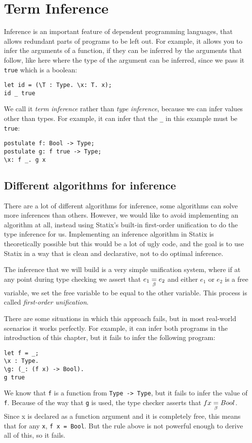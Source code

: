 \chapter{Term Inference}
\label{ch:inference}

Inference is an important feature of dependent programming languages, that allows redundant parts of programs to be left out. For example, it allows you to infer the arguments of a function, if they can be inferred by the arguments that follow, like here where the type of the argument can be inferred, since we pass it \verb|true| which is a boolean:
\begin{lstlisting}
let id = (\T : Type. \x: T. x);
id _ true
\end{lstlisting}

We call it \emph{term inference} rather than \emph{type inference}, because we can infer values other than types. For example, it can infer that the \verb|_| in this example must be \verb|true|:
\begin{lstlisting}
postulate f: Bool -> Type;
postulate g: f true -> Type;
\x: f _. g x
\end{lstlisting}

\section{Different algorithms for inference}
\label{strength-inference}

There are a lot of different algorithms for inference\cite{typeinference}, some algorithms can solve more inferences than others. However, we would like to avoid implementing an algorithm at all, instead using Statix's built-in first-order unification to do the type inference for us. Implementing an inference algorithm in Statix is theoretically possible but this would be a lot of ugly code, and the goal is to use Statix in a way that is clean and declarative, not to do optimal inference.

The inference that we will build is a very simple unification system, where if at any point during type checking we assert that $e_1 \underset{\beta}{=} e_2$ and either $e_1$ or $e_2$ is a free variable, we set the free variable to be equal to the other variable. This process is called \emph{first-order unification}.

There are some situations in which this approach fails, but in most real-world scenarios it works perfectly. For example, it can infer both programs in the introduction of this chapter, but it fails to infer the following program:
\begin{lstlisting}
let f = _;
\x : Type.
\g: (_: (f x) -> Bool).
g true
\end{lstlisting}
We know that \verb|f| is a function from \verb|Type -> Type|, but it fails to infer the value of \verb|f|. Because of the way that \verb|g| is used, the type checker asserts that $f x \underset{\beta}{=} Bool$. Since x is declared as a function argument and it is completely free, this means that for any \verb|x|, \verb|f x = Bool|. But the rule above is not powerful enough to derive all of this, so it fails.

